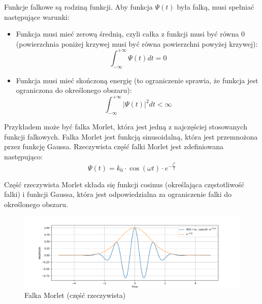 Funkcje falkowe są rodziną funkcji. Aby funkcja $\Psi(t)$ była falką, musi spełniać następujące warunki:
\begin{itemize}
    \item Funkcja musi mieć zerową średnią, czyli całka z funkcji musi być równa 0 (powierzchnia poniżej krzywej musi być równa powierzchni powyżej krzywej):
        \begin{equation}
            \int_{-\infty}^{+\infty} \Psi(t) d t=0
        \end{equation}
    \item Funkcja musi mieć skończoną energię (to ograniczenie sprawia, że funkcja jest ograniczona do określonego obszaru):
        \begin{equation}
            \int_{-\infty}^{+\infty}|\Psi(t)|^{2} d t<\infty
        \end{equation}
\end{itemize}

Przykładem może być falka Morlet, która jest jedną z najczęściej stosowanych funkcji falkowych. Falka Morlet jest funkcją sinusoidalną, która jest przemnożona przez funkcję Gaussa. Rzeczywista część falki Morlet jest zdefiniowana następująco:
\begin{equation}
    \Psi(t)=k_0 \cdot \cos (\omega t) \cdot e^{-\frac{t^2}{2}}
\end{equation}

Część rzeczywista Morlet składa się funkcji cosinus (określająca częstotliwość falki) i funkcji Gaussa, która jest odpowiedzialna za ograniczenie falki do określonego obszaru.

\begin{figure}[ht]
    \centering
    \begin{minipage}[t]{0.7\linewidth}
        \includegraphics[width=\linewidth]{Rozdziały/02.Podstawy_teoretyczne/Obrazy/morlet_e}
        \caption{Falka Morlet (część rzeczywista)}
        \label{fig:image29}
    \end{minipage}
\end{figure}

